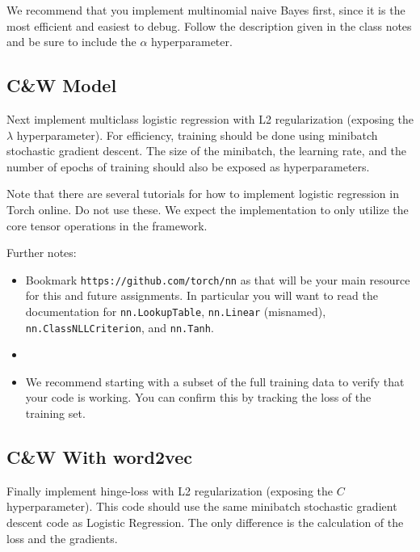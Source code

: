 \documentclass[11pt]{article}
\begin{document}
We recommend that you implement multinomial naive Bayes first, since
it is the most efficient and easiest to debug. Follow the description
given in the class notes and be sure to include the $\alpha$
hyperparameter.

\subsection{C\&W Model}

Next implement multiclass logistic regression with L2 regularization
(exposing the $\lambda$ hyperparameter). For efficiency, training
should be done using minibatch stochastic gradient descent. The size
of the minibatch, the learning rate, and the number of epochs of
training should also be exposed as hyperparameters.

Note that there are several tutorials for how to implement logistic
regression in Torch online. Do not use these. We expect the
implementation to only utilize the core tensor operations in the
framework.

Further notes:

\begin{itemize}
\item Bookmark \texttt{https://github.com/torch/nn} as that will be
  your main resource for this and future assignments. In particular
  you will want to read the documentation for \texttt{nn.LookupTable},
  \texttt{nn.Linear} (misnamed), \texttt{nn.ClassNLLCriterion}, and
  \texttt{nn.Tanh}.

\item 

\item We recommend starting with a subset of the full training data to
  verify that your code is working. You can confirm this by tracking
  the loss of the training set.
\end{itemize}

\subsection{C\&W With word2vec}

Finally implement hinge-loss with L2 regularization (exposing the $C$
hyperparameter). This code should use the same minibatch stochastic
gradient descent code as Logistic Regression. The only difference is
the calculation of the loss and the gradients. 

\subsection{} 
\end{document}
